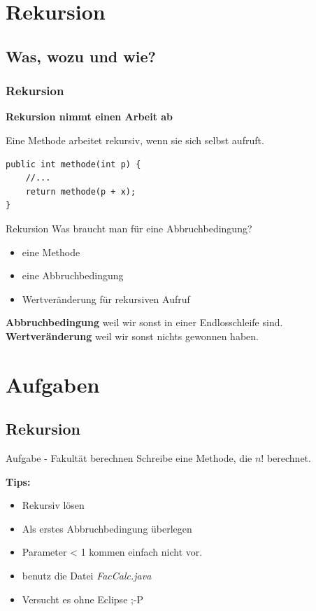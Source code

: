 \documentclass[18pt]{beamer}
\begin{document}

\section{Rekursion}
\subsection*{Was, wozu und wie?}
\begin{frame}[containsverbatim]
	\frametitle{Rekursion}
	\textbf{Rekursion nimmt einen Arbeit ab}	
	
	Eine Methode arbeitet rekursiv, wenn sie sich selbst aufruft.
	
	\begin{lstlisting}
public int methode(int p) {
	//...
	return methode(p + x);
}
	\end{lstlisting}
\end{frame}


\begin{frame}{Rekursion}
	Was braucht man für eine Abbruchbedingung?
	
	\begin{itemize}
		\item eine Methode \pause
		\item eine Abbruchbedingung \pause
		\item Wertveränderung für rekursiven Aufruf \pause
	\end{itemize}
	
	\textbf{Abbruchbedingung} weil wir sonst in einer Endlosschleife sind.
	\textbf{Wertveränderung} weil wir sonst nichts gewonnen haben.
\end{frame}


\section{Aufgaben}
\subsection{Rekursion}
\begin{frame}{Aufgabe - Fakultät berechnen}
	Schreibe eine Methode, die $n!$ berechnet.
	
	\textbf{Tips:}
	\begin{itemize}
		\item Rekursiv lösen
		\item Als erstes Abbruchbedingung überlegen
		\item Parameter < 1 kommen einfach nicht vor.
		\item benutz die Datei \emph{FacCalc.java}
		\item Versucht es ohne Eclipse ;-P
	\end{itemize}
\end{frame}
\end{document}
